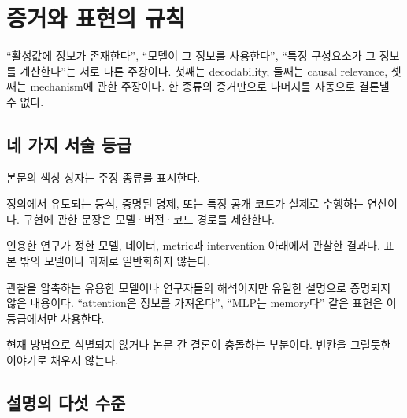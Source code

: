 \chapter*{증거와 표현의 규칙}

\begin{factbox}
``활성값에 정보가 존재한다'', ``모델이 그 정보를 사용한다'', ``특정 구성요소가 그 정보를 계산한다''는 서로 다른 주장이다.
첫째는 decodability, 둘째는 causal relevance, 셋째는 mechanism에 관한 주장이다.
한 종류의 증거만으로 나머지를 자동으로 결론낼 수 없다.
\end{factbox}

\section*{네 가지 서술 등급}

본문의 색상 상자는 주장 종류를 표시한다.

\begin{description}[style=nextline,leftmargin=2em]
  \item[수학적 사실 또는 명시된 구현]
  정의에서 유도되는 등식, 증명된 명제, 또는 특정 공개 코드가 실제로 수행하는 연산이다.
  구현에 관한 문장은 모델·버전·코드 경로를 제한한다.

  \item[실험 결과]
  인용한 연구가 정한 모델, 데이터, metric과 intervention 아래에서 관찰한 결과다.
  표본 밖의 모델이나 과제로 일반화하지 않는다.

  \item[제한된 해석]
  관찰을 압축하는 유용한 모델이나 연구자들의 해석이지만 유일한 설명으로 증명되지 않은 내용이다.
  ``attention은 정보를 가져온다'', ``MLP는 memory다'' 같은 표현은 이 등급에서만 사용한다.

  \item[한계 또는 열린 문제]
  현재 방법으로 식별되지 않거나 논문 간 결론이 충돌하는 부분이다.
  빈칸을 그럴듯한 이야기로 채우지 않는다.
\end{description}

\section*{설명의 다섯 수준}

